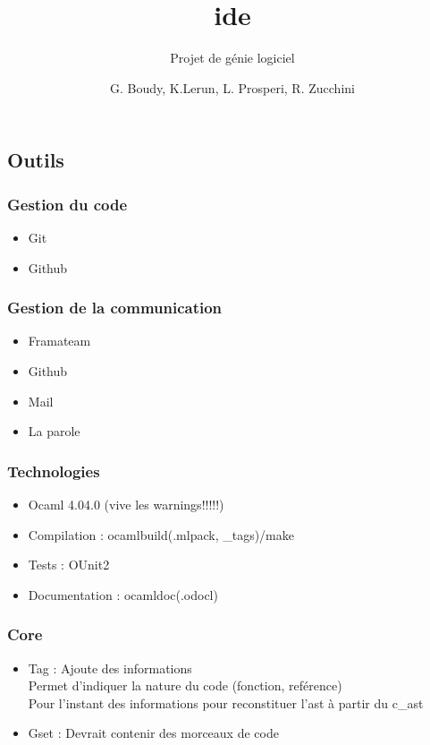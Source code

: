 \documentclass{beamer}
\title{ide}
\subtitle{Projet de génie logiciel}
\author{G. Boudy, K.Lerun, L. Prosperi, R. Zucchini}
\begin{document}
\maketitle

\begin{frame}
    \section{Outils}
    \frametitle{Gestion du code}

    \begin{itemize}
        \item Git
        \item Github    
    \end{itemize}   
\end{frame}    

\begin{frame}
    \frametitle{Gestion de la communication}

    \begin{itemize}
        \item Framateam
        \item Github
        \item Mail
        \item La parole
    \end{itemize}        
\end{frame}

\begin{frame}
    \frametitle{Technologies}

    \begin{itemize}
        \item Ocaml 4.04.0 (vive les warnings!!!!!)
        \item Compilation : ocamlbuild(.mlpack, \_tags)/make
        \item Tests : OUnit2 
        \item Documentation : ocamldoc(.odocl)     
    \end{itemize}        
\end{frame}    

\begin{frame}
    \frametitle{Core} 

    \begin{itemize}
        \item Tag : Ajoute des informations \\
        Permet d'indiquer la nature du code (fonction, reférence) \\
        Pour l'instant des informations pour reconstituer l'ast à partir du c\_ast
        \item Gset : Devrait contenir des morceaux de code
    \end{itemize}
\end{frame}
\end{document}
